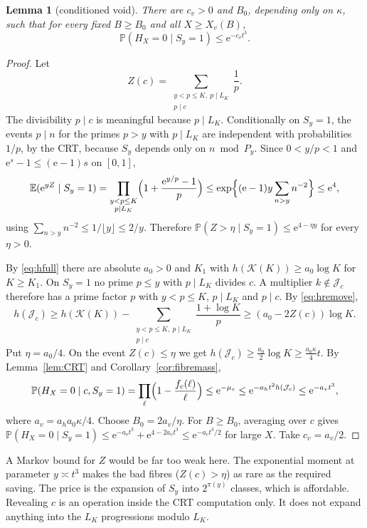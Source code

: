 \documentclass[10pt,reqno]{amsart}
\newtheorem{lemma}[theorem]{Lemma}
\theoremstyle{remark}
\newcommand{\K}{\mathcal K}
\newcommand{\J}{\mathcal J}
\newcommand{\E}{\mathbb E}
\newcommand{\Prob}{\mathbb P}
\newcommand{\e}{\mathrm e}
\begin{document}
\begin{lemma}[conditioned void]\label{lem:void}
There are $c_v>0$ and $B_0$, depending only on $\kappa$, such that for
every fixed $B\geq B_0$ and all $X\geq X_v(B)$,
\begin{equation}\label{eq:void}
 \Prob(H_X=0\mid S_y=1)\leq\e^{-c_vt^3}.
\end{equation}
\end{lemma}
\begin{proof}
Let
\[
 Z(c)=\sum_{\substack{y<p\leq K,\ p\mid L_K\\p\mid c}}\frac1p .
\]
The divisibility $p\mid c$ is meaningful because $p\mid L_K$.
Conditionally on $S_y=1$, the events $p\mid n$ for the primes $p>y$ with
$p\mid L_K$ are independent with probabilities $1/p$, by the CRT, because
$S_y$ depends only on $n\bmod P_y$.  Since $0<y/p<1$ and
$\e^s-1\leq(\e-1)s$ on $[0,1]$,
\[
 \E(\e^{yZ}\mid S_y=1)=\prod_{\substack{y<p\leq K\\p\mid L_K}}
 \Bigl(1+\frac{\e^{y/p}-1}p\Bigr)
 \leq\exp\Bigl\{(\e-1)y\sum_{n>y}n^{-2}\Bigr\}\leq\e^{4},
\]
using $\sum_{n>y}n^{-2}\leq1/\lfloor y\rfloor\leq2/y$.  Therefore
$\Prob(Z>\eta\mid S_y=1)\leq\e^{4-\eta y}$ for every $\eta>0$.

By \eqref{eq:hfull} there are absolute $a_0>0$ and $K_1$ with
$h(\K(K))\geq a_0\log K$ for $K\geq K_1$.  On $S_y=1$ no prime $p\leq y$ with
$p\mid L_K$ divides $c$.  A multiplier $k\notin\J_c$ therefore has a prime factor $p$
with $y<p\leq K$, $p\mid L_K$ and $p\mid c$.  By \eqref{eq:hremove},
\[
 h(\J_c)\geq h(\K(K))-\sum_{\substack{y<p\leq K,\ p\mid L_K\\p\mid c}}
 \frac{1+\log K}p\geq(a_0-2Z(c))\log K .
\]
Put $\eta=a_0/4$.  On the event $Z(c)\leq\eta$ we get
$h(\J_c)\geq\frac{a_0}2\log K\geq\frac{a_0\kappa}4t$.  By
Lemma~\ref{lem:CRT} and Corollary~\ref{cor:fibremass},
\[
 \Prob(H_X=0\mid c,S_y=1)=\prod_\ell\Bigl(1-\frac{f_c(\ell)}\ell\Bigr)
 \leq\e^{-\mu_c}\leq\e^{-a_ht^2h(\J_c)}\leq\e^{-a_vt^3},
\]
where $a_v=a_ha_0\kappa/4$.
Choose $B_0=2a_v/\eta$.  For $B\geq B_0$, averaging over $c$ gives
$\Prob(H_X=0\mid S_y=1)\leq\e^{-a_vt^3}+\e^{4-2a_vt^3}\leq\e^{-a_vt^3/2}$
for large $X$.  Take $c_v=a_v/2$.
\end{proof}
A Markov bound for $Z$ would be far too weak here.  The exponential moment
at parameter $y\asymp t^3$ makes the bad fibres ($Z(c)>\eta$) as rare as the required
saving.  The price is the expansion of $S_y$ into $2^{\pi(y)}$ classes,
which is affordable.  Revealing $c$ is an operation inside the CRT
computation only.  It does not expand anything into the $L_K$ progressions
modulo $L_K$.
\end{document}
